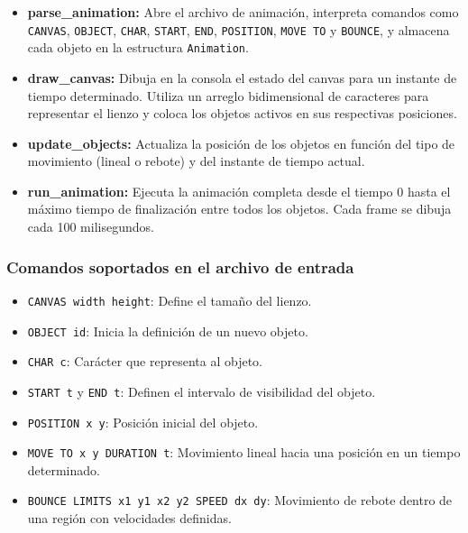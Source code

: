 \documentclass[12pt]{article}
\begin{document}
\begin{itemize}
    \item \textbf{parse\_animation:} Abre el archivo de animación, interpreta comandos como \texttt{CANVAS}, \texttt{OBJECT}, \texttt{CHAR}, \texttt{START}, \texttt{END}, \texttt{POSITION}, \texttt{MOVE TO} y \texttt{BOUNCE}, y almacena cada objeto en la estructura \texttt{Animation}.
    
    \item \textbf{draw\_canvas:} Dibuja en la consola el estado del canvas para un instante de tiempo determinado. Utiliza un arreglo bidimensional de caracteres para representar el lienzo y coloca los objetos activos en sus respectivas posiciones.
    
    \item \textbf{update\_objects:} Actualiza la posición de los objetos en función del tipo de movimiento (lineal o rebote) y del instante de tiempo actual.
    
    \item \textbf{run\_animation:} Ejecuta la animación completa desde el tiempo 0 hasta el máximo tiempo de finalización entre todos los objetos. Cada frame se dibuja cada 100 milisegundos.
\end{itemize}

\subsubsection*{Comandos soportados en el archivo de entrada}

\begin{itemize}
    \item \texttt{CANVAS width height}: Define el tamaño del lienzo.
    \item \texttt{OBJECT id}: Inicia la definición de un nuevo objeto.
    \item \texttt{CHAR c}: Carácter que representa al objeto.
    \item \texttt{START t} y \texttt{END t}: Definen el intervalo de visibilidad del objeto.
    \item \texttt{POSITION x y}: Posición inicial del objeto.
    \item \texttt{MOVE TO x y DURATION t}: Movimiento lineal hacia una posición en un tiempo determinado.
    \item \texttt{BOUNCE LIMITS x1 y1 x2 y2 SPEED dx dy}: Movimiento de rebote dentro de una región con velocidades definidas.
\end{itemize}
\end{document}
